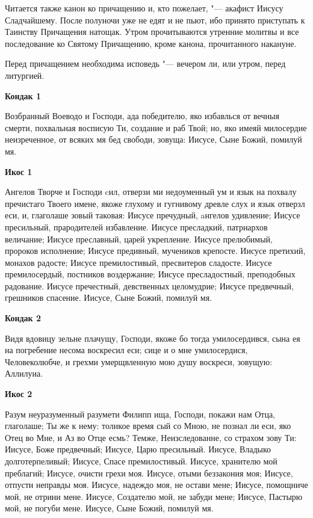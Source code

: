 Читается также канон ко причащению и, кто пожелает, "--- акафист Иисусу Сладчайшему. После полуночи уже не едят и не пьют, ибо принято приступать к Таинству Причащения натощак. Утром прочитываются утренние молитвы и все последование ко Святому Причащению, кроме канона, прочитанного накануне.


Перед причащением необходима исповедь "--- вечером ли, или утром, перед литургией.
\normalfont{}\mychapterending

 
\bfseries Кондак 1\normalfont{}


Возбранный  Воеводо и Господи, ада победителю, яко избавлься от вечныя смерти, похвальная восписую Ти, создание и раб Твой; но, яко имеяй милосердие неизреченное, от всяких мя бед свободи, зовуща: Иисусе, Сыне Божий, помилуй мя.


\medskip
\bfseries Икос 1\normalfont{}\nopagebreak


Ангелов
Творче и Господи cил, отверзи ми недоуменный ум и язык на похвалу пречистаго Твоего имене, якоже глухому и гугнивому древле слух и язык отверзл еси, и, глаголаше зовый таковая: Иисусе пречудный, aнгелов удивление; Иисусе пресильный, прародителей избавление. Иисусе пресладкий, патриархов величание; Иисусе преславный, царей укрепление. Иисусе прелюбимый, пророков исполнение; Иисусе предивный, мучеников крепосте. Иисусе претихий, монахов радосте; Иисусе премилостивый,
пресвитеров сладосте. Иисусе премилосердый, постников воздержание; Иисусе пресладостный, преподобных радование. Иисусе пречестный, девственных целомудрие; Иисусе предвечный, грешников спасение. Иисусе, Сыне Божий, помилуй мя.


\medskip
\bfseries Кондак 2\normalfont{}\nopagebreak


Видя
вдовицу зельне плачущу, Господи, якоже бо тогда умилосердився, сына ея на погребение несома воскресил еси; сице и о мне умилосердися, Человеколюбче, и грехми умерщвленную мою душу воскреси, зовущую: Аллилуиа.


\medskip
\bfseries Икос 2\normalfont{}\nopagebreak


Разум
неуразуменный разумети Филипп ища, Господи, покажи нам Отца, глаголаше; Ты же к нему: толикое время сый со Мною, не познал ли еси, яко Отец во Мне, и Аз во Отце есмь? Темже, Неизследованне, со страхом зову Ти: Иисусе, Боже предвечный; Иисусе, Царю пресильный. Иисусе, Владыко долготерпеливый; Иисусе, Спасе премилостивый. Иисусе, хранителю мой преблагий; Иисусе, очисти грехи моя. Иисусе, отыми беззакония моя; Иисусе, отпусти неправды моя. Иисусе, надеждо моя, не остави мене; Иисусе, помощниче мой, не отрини мене. Иисусе, Создателю мой, не забуди
мене; Иисусе, Пастырю мой, не погуби мене. Иисусе, Сыне Божий, помилуй мя.


